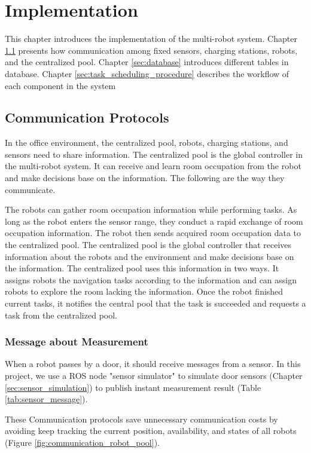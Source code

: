 \chapter{Implementation}
This chapter introduces the implementation of the multi-robot system. Chapter \ref{sec:communication_protocols} presents how communication among fixed sensors, charging stations, robots, and the centralized pool. Chapter \ref{sec:database} introduces different tables in database. Chapter \ref{sec:task_scheduling_procedure} describes the workflow of each component in the system


\section{Communication Protocols}
\label{sec:communication_protocols}

In the office environment, the centralized pool, robots, charging stations, and sensors need to share information. The centralized pool is the global controller in the multi-robot system. It can receive and learn room occupation from the robot and make decisions base on the information. The following are the way they communicate.

The robots can gather room occupation information while performing tasks. As long as the robot enters the sensor range, they conduct a rapid exchange of room occupation information. The robot then sends acquired room occupation data to the centralized pool. The centralized pool is the global controller that receives information about the robots and the environment and make decisions base on the information. The centralized pool uses this information in two ways. It assigns robots the navigation tasks according to the information and can assign robots to explore the room lacking the information. Once the robot finished current tasks, it notifies the central pool that the task is succeeded and requests a task from the centralized pool.

\subsection{Message about Measurement}
\label{sec:measurement_message}
When a robot passes by a door, it should receive messages from a sensor. In this project, we use a ROS node "sensor simulator" to simulate door sensors (Chapter \ref{sec:sensor_simulation}) to publish instant measurement result (Table \ref{tab:sensor_message}).

These Communication protocols save unnecessary communication costs by avoiding keep tracking the current position, availability, and states of all robots (Figure \ref{fig:communication_robot_pool}).

